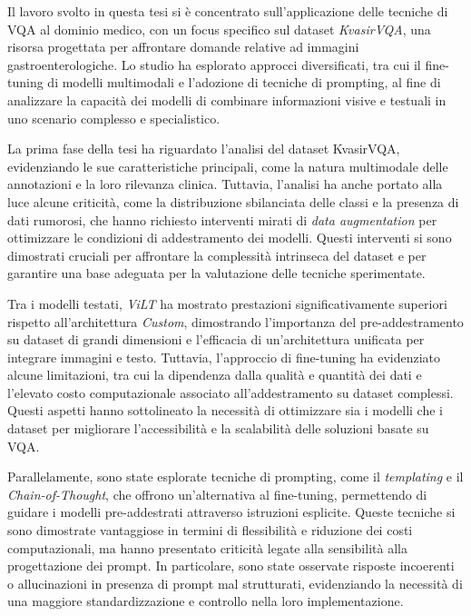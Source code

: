 \documentclass[../main.tex]{subfiles}
\begin{document}
Il lavoro svolto in questa tesi si è concentrato sull'applicazione delle tecniche di VQA al dominio medico, con un focus specifico sul dataset \textit{KvasirVQA}, una risorsa progettata per affrontare domande relative ad immagini gastroenterologiche. Lo studio ha esplorato approcci diversificati, tra cui il fine-tuning di modelli multimodali e l'adozione di tecniche di prompting, al fine di analizzare la capacità dei modelli di combinare informazioni visive e testuali in uno scenario complesso e specialistico.

La prima fase della tesi ha riguardato l'analisi del dataset KvasirVQA, evidenziando le sue caratteristiche principali, come la natura multimodale delle annotazioni e la loro rilevanza clinica. Tuttavia, l'analisi ha anche portato alla luce alcune criticità, come la distribuzione sbilanciata delle classi e la presenza di dati rumorosi, che hanno richiesto interventi mirati di \textit{data augmentation} per ottimizzare le condizioni di addestramento dei modelli. Questi interventi si sono dimostrati cruciali per affrontare la complessità intrinseca del dataset e per garantire una base adeguata per la valutazione delle tecniche sperimentate.

Tra i modelli testati, \textit{ViLT} ha mostrato prestazioni significativamente superiori rispetto all'architettura \textit{Custom}, dimostrando l'importanza del pre-addestramento su dataset di grandi dimensioni e l'efficacia di un'architettura unificata per integrare immagini e testo. Tuttavia, l'approccio di fine-tuning ha evidenziato alcune limitazioni, tra cui la dipendenza dalla qualità e quantità dei dati e l'elevato costo computazionale associato all'addestramento su dataset complessi. Questi aspetti hanno sottolineato la necessità di ottimizzare sia i modelli che i dataset per migliorare l'accessibilità e la scalabilità delle soluzioni basate su VQA.

Parallelamente, sono state esplorate tecniche di prompting, come il \textit{templating} e il \textit{Chain-of-Thought}, che offrono un'alternativa al fine-tuning, permettendo di guidare i modelli pre-addestrati attraverso istruzioni esplicite. Queste tecniche si sono dimostrate vantaggiose in termini di flessibilità e riduzione dei costi computazionali, ma hanno presentato criticità legate alla sensibilità alla progettazione dei prompt. In particolare, sono state osservate risposte incoerenti o allucinazioni in presenza di prompt mal strutturati, evidenziando la necessità di una maggiore standardizzazione e controllo nella loro implementazione.
\end{document}
